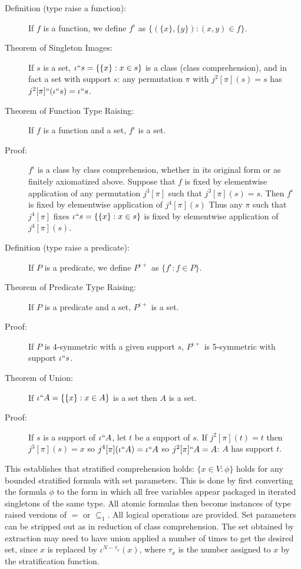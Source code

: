 \documentclass[12pt]{article}
\begin{document}
\begin{description}

\item[Definition (type raise a function):]  If $f$ is a function, we
define $f^\iota$ as $\{(\{x\},\{y\}):(x,y)\in f\}$.

\item[Theorem of Singleton Images:]  If $s$ is a set, $\iota``s = \{\{x\}:x \in s\}$ is a class (class comprehension), and in fact a set with support $s$:  any permutation $\pi$ with $j^2[\pi](s)=s$ has $j^2[\pi]``(\iota``s) = \iota``s$.

\item[Theorem of Function Type Raising:]  If $f$ is a function and a set, $f^{\iota}$ is a set.

\item[Proof:]  $f^{\iota}$ is a class by class comprehension, whether in its original form or as finitely axiomatized above.  Suppose that $f$ is fixed by elementwise application of any permutation $j^3[\pi]$ such that $j^3[\pi](s)=s$.
Then $f^{\iota}$ is fixed by elementwise application of $j^4[\pi](s)$   Thus any $\pi$ such that $j^4[\pi]$ fixes $\iota``s =\{\{x\}:x\in s\}$ is fixed by elementwise application of $j^4[\pi](s)$. 

\item[Definition (type raise a predicate):]  If $P$ is a predicate,
we define $P^{\iota+}$ as $\{f^{\iota}:f \in P\}$.

\item[Theorem of Predicate Type Raising:]  If $P$ is a predicate 
and a set, $P^{\iota+}$ is a set.

\item[Proof:]  If $P$ is 4-symmetric with a given support $s$,
$P^{\iota+}$ is 5-symmetric with support $\iota``s$.

\item[Theorem of Union:]  If $\iota``A = \{\{x\}:x \in A\}$ is a set then $A$ is a set.

\item[Proof:]  If $s$ is a support of $\iota``A$, let $t$ be a support of $s$.  If $j^2[\pi](t)=t$ then
$j^3[\pi](s)=x$ so $j^4[\pi](\iota``A)=\iota``A$ so $j^2[\pi]``A=A$:  $A$ has support $t$.

\end{description}

This establishes that stratified comprehension holds:  $\{x \in V:\phi\}$ holds for any bounded stratified formula
with set parameters.  This is done by first converting the formula $\phi$ to the form in which all free variables appear packaged in iterated singletons of the same type.  All atomic formulas then become instances of type raised versions of $=$ or $\subseteq_1$.  All logical operations are provided.  Set parameters can be stripped out as in reduction of class comprehension.  The set obtained by extraction may need to have union applied a number of times to get the desired set,
since $x$ is replaced by $\iota^{N-\tau_x}(x)$, where $\tau_x$ is the number assigned to $x$ by the stratification function.
\end{document}
